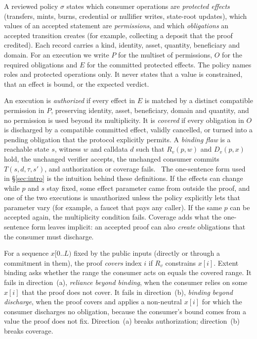 A reviewed policy $\sigma$ states which consumer operations are
\emph{protected effects} (transfers, mints, burns, credential or nullifier
writes, state-root updates), which values of an accepted statement are
\emph{permissions}, and which \emph{obligations} an accepted transition
creates (for example, collecting a deposit that the proof credited). Each
record carries a kind, identity, asset, quantity, beneficiary and domain. For
an execution we write $P$ for the multiset of permissions, $O$ for the
required obligations and $E$ for the committed protected effects. The policy
names roles and protected operations only. It never states that a value is
constrained, that an effect is bound, or the expected verdict.%

An execution is \emph{authorized} if every effect in $E$ is matched by a
distinct compatible permission in $P$, preserving identity, asset,
beneficiary, domain and quantity, and no permission is used beyond its
multiplicity. It is \emph{covered} if every obligation in $O$ is discharged by
a compatible committed effect, validly cancelled, or turned into a pending
obligation that the protocol explicitly permits. A \emph{binding flaw} is a
reachable state $s$, witness $w$ and calldata $d$ such that $R_v(p,w)$ and
$D_v(p,x)$ hold, the unchanged verifier accepts, the unchanged consumer
commits $T(s,d,\tau,s')$, and authorization or coverage fails.%
\
The one-sentence form used in \S\ref{sec:intro} is the intuition behind
these definitions. If the effects can change while $p$ and $s$ stay fixed,
some effect parameter came from outside the proof, and one of the two
executions is unauthorized unless the policy explicitly lets that parameter
vary (for example, a faucet that pays any caller). If the same $p$ can be accepted again, the
multiplicity condition fails. Coverage adds what the one-sentence form
leaves implicit: an accepted proof can also \emph{create} obligations that
the consumer must discharge.

For a sequence $x[0..L)$ fixed by the public inputs (directly or through a
commitment in them), the proof \emph{covers} index $i$ if $R_v$ constrains
$x[i]$. Extent binding asks whether the range the consumer acts on equals the
covered range. It fails in direction~(a), \emph{reliance beyond binding}, when
the consumer relies on some $x[i]$ that the proof does not cover. It fails in
direction~(b), \emph{binding beyond discharge}, when the proof covers and
applies a non-neutral $x[i]$ for which the consumer discharges no
obligation, because the consumer's bound comes from a value the proof does not
fix. Direction~(a) breaks authorization; direction~(b) breaks coverage.%

